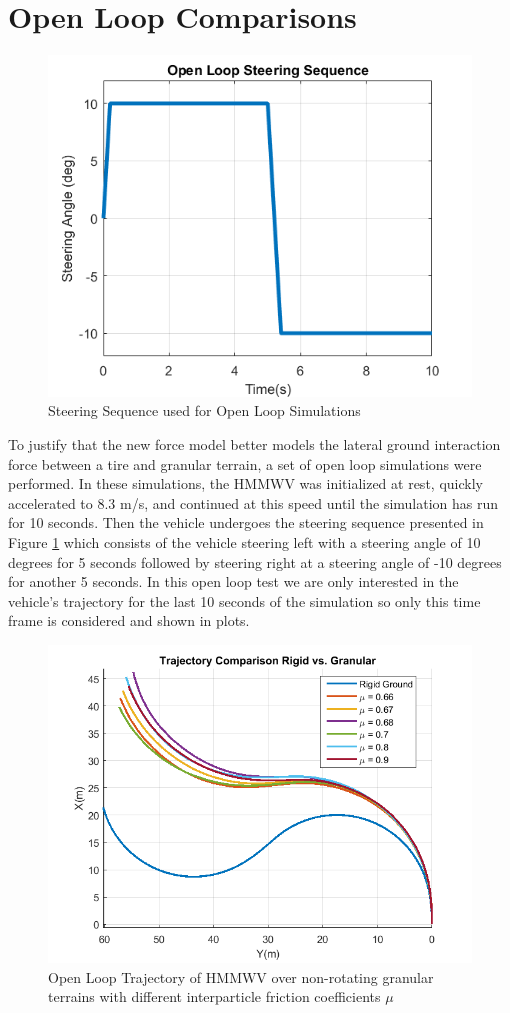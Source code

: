 \documentclass[12pt,onecolumn]{report}
\begin{document}
\section{Open Loop Comparisons}\label{s:OpenLoop}

\begin{figure}
	\centering
	\includegraphics[width=0.8\columnwidth]{Figs/openLoopSteer.png}
	\caption{\small Steering Sequence used for Open Loop Simulations}  
	\label{fig:openSteer}
\end{figure}

To justify that the new force model better models the lateral ground interaction force between a tire and granular terrain, a set of open loop simulations were performed. In these simulations, the HMMWV was initialized at rest, quickly accelerated to 8.3 m/s, and continued at this speed until the simulation has run for 10 seconds. Then the vehicle undergoes the steering sequence presented in Figure \ref{fig:openSteer} which consists of the vehicle steering left with a steering angle of 10 degrees for 5 seconds followed by steering right at a steering angle of -10 degrees for another 5 seconds. In this open loop test we are only interested in the vehicle's trajectory for the last 10 seconds of the simulation so only this time frame is considered and shown in plots.

\begin{figure}
	\centering
	\includegraphics[width=0.8\columnwidth]{Figs/trajectoryComparison_png.png}
	\caption{\small Open Loop Trajectory of HMMWV over non-rotating granular terrains with different interparticle friction coefficients $\mu$}  
	\label{fig:openLoopmu}
\end{figure}
\end{document}
